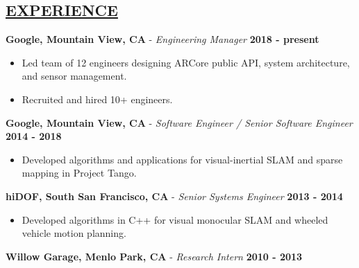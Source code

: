 \documentclass[line,margin]{res}
\newenvironment{compactlist}{
	\begin{itemize}\itemsep=0pt
}{
	\end{itemize}
}
\begin{document}

\address{164 Granada Dr, Mountain View, CA 94043}
\address{650.762.6844 $\mid$ adamleeper@gmail.com}
\address{github.com/aleeper}
\address{linkedin.com/in/adam-leeper}
\address{www.adamleeper.com}



\begin{resume}
%
\section{\underline{EXPERIENCE}}
\vspace{1.0pc}
{\bf Google, Mountain View, CA} - \emph{Engineering Manager}
  \hfill \textbf{2018 - present}
  \begin{compactlist}
    \item Led team of 12 engineers designing ARCore public API,
      system architecture, and sensor management.
    \item Recruited and hired 10+ engineers.
  \end{compactlist}
{\bf Google, Mountain View, CA} - \emph{Software Engineer / Senior Software Engineer}
  \hfill \textbf{2014 - 2018}
  \begin{compactlist}
    \item Developed algorithms and applications for
      visual-inertial SLAM and sparse mapping in Project Tango.
  \end{compactlist}
{\bf hiDOF, South San Francisco, CA} - \emph{Senior Systems Engineer}
  \hfill \textbf{2013 - 2014}
  \begin{compactlist}
    \item Developed algorithms in C++ for visual monocular SLAM and wheeled vehicle motion planning.
  \end{compactlist}
{\bf Willow Garage, Menlo Park, CA} - \emph{Research Intern}
  \hfill \textbf{2010 - 2013}
  \begin{compactlist}

\end{compactlist}
\end{resume}
\end{document}
